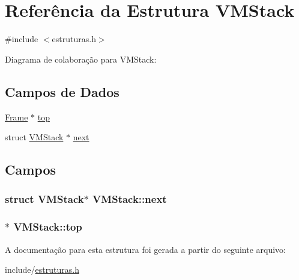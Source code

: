 \hypertarget{struct_v_m_stack}{}\section{Referência da Estrutura V\+M\+Stack}
\label{struct_v_m_stack}


{\ttfamily \#include $<$estruturas.\+h$>$}



Diagrama de colaboração para V\+M\+Stack\+:
\subsection*{Campos de Dados}
\begin{DoxyCompactItemize}
\item 
\hyperlink{struct_frame}{Frame} $\ast$ \hyperlink{struct_v_m_stack_a4ced44fa90e0389a8b25963637c1708d}{top}
\item 
struct \hyperlink{struct_v_m_stack}{V\+M\+Stack} $\ast$ \hyperlink{struct_v_m_stack_ab4cf67571dfab96182dfd57bf6037d6b}{next}
\end{DoxyCompactItemize}


\subsection{Campos}
\subsubsection[{\texorpdfstring{next}{next}}]{\setlength{\rightskip}{0pt plus 5cm}struct {\bf V\+M\+Stack}$\ast$ V\+M\+Stack\+::next}\hypertarget{struct_v_m_stack_ab4cf67571dfab96182dfd57bf6037d6b}{}\label{struct_v_m_stack_ab4cf67571dfab96182dfd57bf6037d6b}
\subsubsection[{\texorpdfstring{top}{top}}]{$\ast$ V\+M\+Stack\+::top}\hypertarget{struct_v_m_stack_a4ced44fa90e0389a8b25963637c1708d}{}\label{struct_v_m_stack_a4ced44fa90e0389a8b25963637c1708d}


A documentação para esta estrutura foi gerada a partir do seguinte arquivo\+:\begin{DoxyCompactItemize}
\item 
include/\hyperlink{estruturas_8h}{estruturas.\+h}\end{DoxyCompactItemize}
